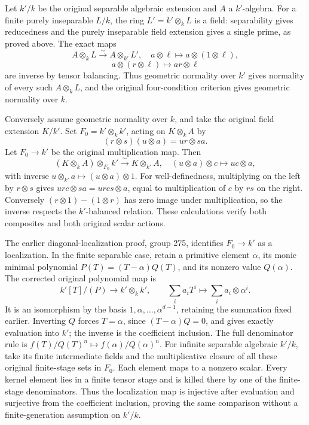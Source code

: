 Let \(k'/k\) be the original separable algebraic extension and \(A\) a \(k'\)-algebra. For a finite purely inseparable \(L/k\), the ring \(L'=k'\otimes_kL\) is a field: separability gives reducedness and the purely inseparable field extension gives a single prime, as proved above. The exact maps \[
 A\otimes_kL\xrightarrow{\sim}A\otimes_{k'}L',
 \quad a\otimes\ell\longmapsto a\otimes(1\otimes\ell),
\] \[
 a\otimes(r\otimes\ell)\longmapsto ar\otimes\ell
\] are inverse by tensor balancing. Thus geometric normality over \(k'\) gives normality of every such \(A\otimes_kL\), and the original four-condition criterion gives geometric normality over \(k\).

Conversely assume geometric normality over \(k\), and take the original field extension \(K/k'\). Set \(F_0=k'\otimes_kk'\), acting on \(K\otimes_kA\) by \[
 (r\otimes s)(u\otimes a)=ur\otimes sa.
\] Let \(F_0\to k'\) be the original multiplication map. Then \[
 (K\otimes_kA)\otimes_{F_0}k'
 \xrightarrow{\sim}K\otimes_{k'}A,
 \quad (u\otimes a)\otimes c\longmapsto uc\otimes a,
\] with inverse \(u\otimes_{k'}a\mapsto(u\otimes a)\otimes1\). For well-definedness, multiplying on the left by \(r\otimes s\) gives \(urc\otimes sa=urcs\otimes a\), equal to multiplication of \(c\) by \(rs\) on the right. Conversely \((r\otimes1)-(1\otimes r)\) has zero image under multiplication, so the inverse respects the \(k'\)-balanced relation. These calculations verify both composites and both original scalar actions.

The earlier diagonal-localization proof, group 275, identifies \(F_0\to k'\) as a localization. In the finite separable case, retain a primitive element \(\alpha\), its monic minimal polynomial \(P(T)=(T-\alpha)Q(T)\), and its nonzero value \(Q(\alpha)\). The corrected original polynomial map is \[
 k'[T]/(P)\longrightarrow k'\otimes_kk',\qquad
 \sum_i a_iT^i\longmapsto\sum_i a_i\otimes\alpha^i.
\] It is an isomorphism by the basis \(1,\alpha,\ldots,\alpha^{d-1}\), retaining the summation fixed earlier. Inverting \(Q\) forces \(T=\alpha\), since \((T-\alpha)Q=0\), and gives exactly evaluation into \(k'\); the inverse is the coefficient inclusion. The full denominator rule is \(f(T)/Q(T)^n\mapsto f(\alpha)/Q(\alpha)^n\). For infinite separable algebraic \(k'/k\), take its finite intermediate fields and the multiplicative closure of all these original finite-stage sets in \(F_0\). Each element maps to a nonzero scalar. Every kernel element lies in a finite tensor stage and is killed there by one of the finite-stage denominators. Thus the localization map is injective after evaluation and surjective from the coefficient inclusion, proving the same comparison without a finite-generation assumption on \(k'/k\).

